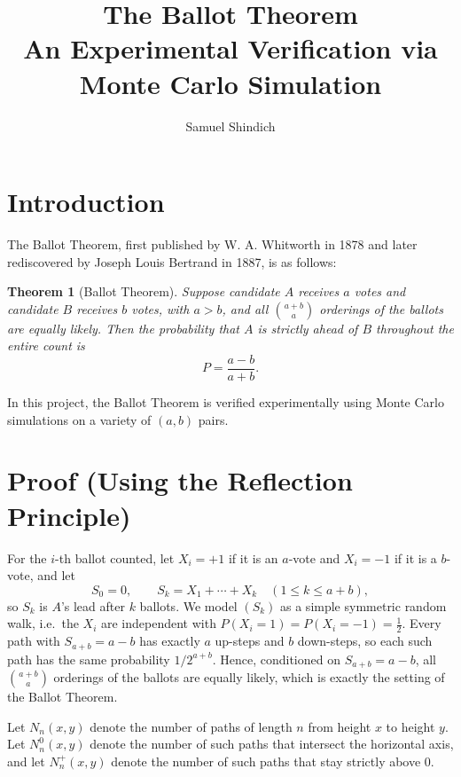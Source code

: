 \documentclass[11pt]{article}
\title{\textbf{The Ballot Theorem}\\[0.3em]
       \large An Experimental Verification via Monte Carlo Simulation}
\author{Samuel Shindich}
\date{}
\theoremstyle{plain}
\newtheorem{theorem}{Theorem}
\begin{document}
\maketitle

\section{Introduction}

The Ballot Theorem, first published by W. A. Whitworth in 1878 and later rediscovered by
Joseph Louis Bertrand in 1887, is as follows:

\begin{theorem}[Ballot Theorem]
Suppose candidate $A$ receives $a$ votes and candidate $B$ receives $b$ votes,
with $a > b$, and all $\binom{a+b}{a}$ orderings of the ballots are equally
likely. Then the probability that $A$ is strictly ahead of $B$ throughout the
entire count is
\[
  P = \frac{a-b}{a+b}.
\]
\end{theorem}

In this project, the Ballot Theorem is verified experimentally using Monte Carlo
simulations on a variety of $(a,b)$ pairs.

\section{Proof (Using the Reflection Principle)}

For the $i$-th ballot counted, let $X_i = +1$ if it is an $a$-vote and
$X_i = -1$ if it is a $b$-vote, and let
\[
  S_0 = 0, \qquad S_k = X_1 + \cdots + X_k \quad (1 \le k \le a+b),
\]
so $S_k$ is $A$'s lead after $k$ ballots. We model $(S_k)$ as a simple symmetric
random walk, i.e.\ the $X_i$ are independent with
$P(X_i = 1) = P(X_i = -1) = \tfrac12$. Every path with $S_{a+b} = a-b$ has
exactly $a$ up-steps and $b$ down-steps, so each such path has the same
probability $1/2^{a+b}$. Hence, conditioned on $S_{a+b} = a-b$, all
$\binom{a+b}{a}$ orderings of the ballots are equally likely, which is exactly
the setting of the Ballot Theorem.

Let $N_n(x,y)$ denote the number of paths of length $n$ from height $x$ to
height $y$. Let $N^{0}_n(x,y)$ denote the number of such paths that intersect
the horizontal axis, and let $N^{+}_n(x,y)$ denote the number of such paths that
stay strictly above $0$.
\end{document}
